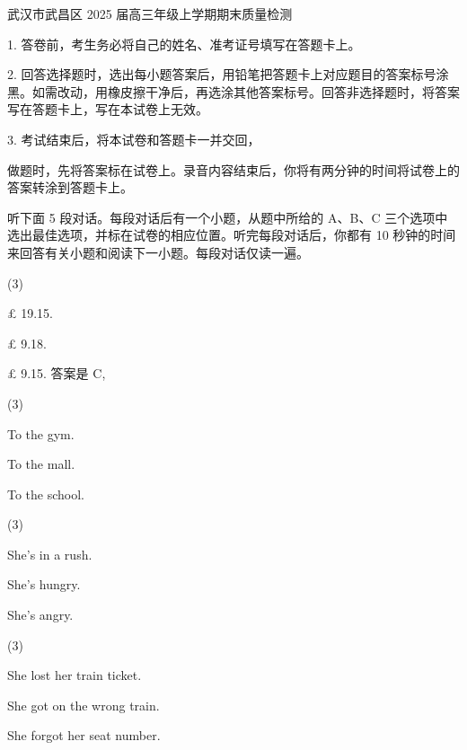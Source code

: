 \documentclass{英语试卷}
\begin{document}
\par 武汉市武昌区 2025 届高三年级上学期期末质量检测\par
\begin{notice}
\par 1. 答卷前，考生务必将自己的姓名、准考证号填写在答题卡上。\par
\par 2. 回答选择题时，选出每小题答案后，用铅笔把答题卡上对应题目的答案标号涂黑。如需改动，用橡皮擦干净后，再选涂其他答案标号。回答非选择题时，将答案写在答题卡上，写在本试卷上无效。\par
\par 3. 考试结束后，将本试卷和答题卡一并交回，\par
\end{notice}
\par 做题时，先将答案标在试卷上。录音内容结束后，你将有两分钟的时间将试卷上的答案转涂到答题卡上。\par
{}
\par 听下面 5 段对话。每段对话后有一个小题，从题中所给的 A、B、C 三个选项中选出最佳选项，并标在试卷的相应位置。听完每段对话后，你都有 10 秒钟的时间来回答有关小题和阅读下一小题。每段对话仅读一遍。\par
{}
\begin{choices}(3)
  \item £ 19.15.
  \item £ 9.18.
  \item £ 9.15. 答案是 C,
\end{choices}
\begin{choices}(3)
  \item To the gym.
  \item To the mall.
  \item To the school.
\end{choices}
\begin{choices}(3)
  \item She's in a rush.
  \item She's hungry.
  \item She's angry.
\end{choices}
\begin{choices}(3)
  \item She lost her train ticket.
  \item She got on the wrong train.
  \item She forgot her seat number.
\end{choices}
\end{document}

